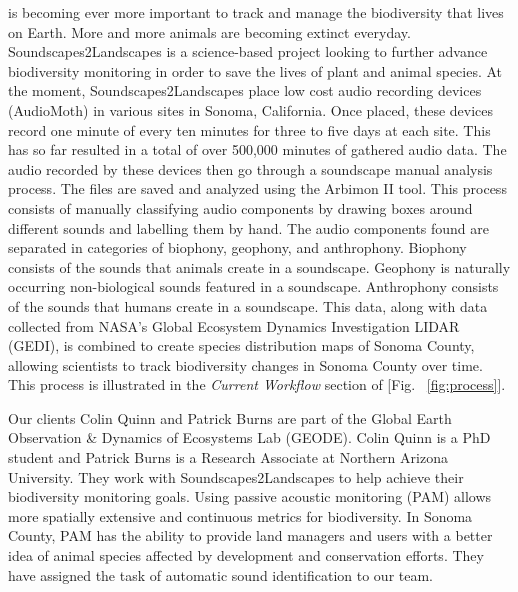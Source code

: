 \documentclass[12pt,journal,compsoc]{IEEEtran}
\begin{document}
 is becoming ever more important to track and manage the biodiversity that lives on Earth. More and more animals are becoming extinct everyday. Soundscapes2Landscapes is a science-based project looking to further advance biodiversity monitoring in order to save the lives of plant and animal species. At the moment, Soundscapes2Landscapes place low cost audio recording devices (AudioMoth) in various sites in Sonoma, California. Once placed, these devices record one minute of every ten minutes for three to five days at each site. This has so far resulted in a total of over 500,000 minutes of gathered audio data. The audio recorded by these devices then go through a soundscape manual analysis process. The files are saved and analyzed using the Arbimon II tool. This process consists of manually classifying audio components by drawing boxes around different sounds and labelling them by hand. The audio components found are separated in categories of biophony, geophony, and anthrophony. Biophony consists of the sounds that animals create in a soundscape. Geophony is naturally occurring non-biological sounds featured in a soundscape. Anthrophony consists of the sounds that humans create in a soundscape. This data, along with data collected from NASA’s Global Ecosystem Dynamics Investigation LIDAR (GEDI), is combined to create species distribution maps of Sonoma County, allowing scientists to track biodiversity changes in Sonoma County over time. This process is illustrated in the \emph{Current Workflow} section of [Fig. ~\ref{fig:process}].

\skippingparagraph Our clients Colin Quinn and Patrick Burns are part of the Global Earth Observation & Dynamics of Ecosystems Lab (GEODE). Colin Quinn is a PhD student and Patrick Burns is a Research Associate at Northern Arizona University. They work with Soundscapes2Landscapes to help achieve their biodiversity monitoring goals. Using passive acoustic monitoring (PAM) allows more spatially extensive and continuous metrics for biodiversity. In Sonoma County, PAM has the ability to provide land managers and users with a better idea of animal species affected by development and conservation efforts. They have assigned the task of automatic sound identification to our team.

\end{document}

